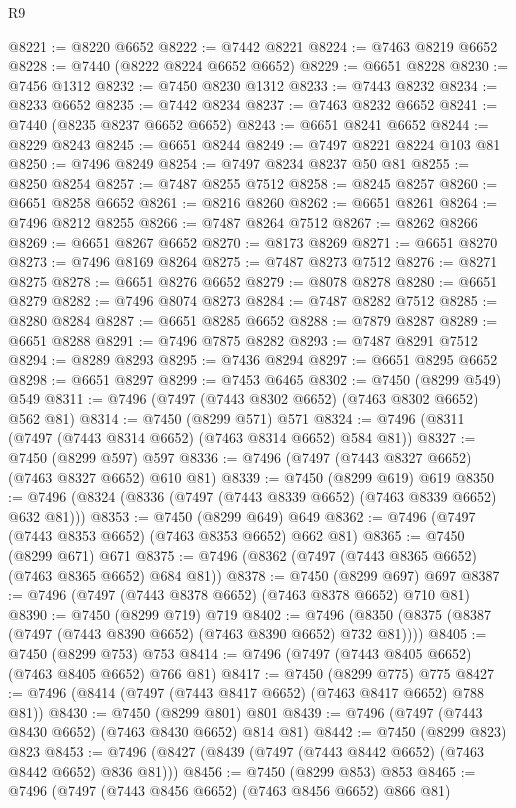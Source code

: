 \begin{lexlean}{R9}
\begin{coremodule}
@8221 := @8220 @6652
@8222 := @7442 @8221
@8224 := @7463 @8219 @6652
@8228 := @7440 (@8222 @8224 @6652 @6652)
@8229 := @6651 @8228
@8230 := @7456 @1312
@8232 := @7450 @8230 @1312
@8233 := @7443 @8232
@8234 := @8233 @6652
@8235 := @7442 @8234
@8237 := @7463 @8232 @6652
@8241 := @7440 (@8235 @8237 @6652 @6652)
@8243 := @6651 @8241 @6652
@8244 := @8229 @8243
@8245 := @6651 @8244
@8249 := @7497 @8221 @8224 @103 @81
@8250 := @7496 @8249
@8254 := @7497 @8234 @8237 @50 @81
@8255 := @8250 @8254
@8257 := @7487 @8255 @7512
@8258 := @8245 @8257
@8260 := @6651 @8258 @6652
@8261 := @8216 @8260
@8262 := @6651 @8261
@8264 := @7496 @8212 @8255
@8266 := @7487 @8264 @7512
@8267 := @8262 @8266
@8269 := @6651 @8267 @6652
@8270 := @8173 @8269
@8271 := @6651 @8270
@8273 := @7496 @8169 @8264
@8275 := @7487 @8273 @7512
@8276 := @8271 @8275
@8278 := @6651 @8276 @6652
@8279 := @8078 @8278
@8280 := @6651 @8279
@8282 := @7496 @8074 @8273
@8284 := @7487 @8282 @7512
@8285 := @8280 @8284
@8287 := @6651 @8285 @6652
@8288 := @7879 @8287
@8289 := @6651 @8288
@8291 := @7496 @7875 @8282
@8293 := @7487 @8291 @7512
@8294 := @8289 @8293
@8295 := @7436 @8294
@8297 := @6651 @8295 @6652
@8298 := @6651 @8297
@8299 := @7453 @6465
@8302 := @7450 (@8299 @549) @549
@8311 := @7496 (@7497 (@7443 @8302 @6652) (@7463 @8302 @6652) @562 @81)
@8314 := @7450 (@8299 @571) @571
@8324 := @7496 (@8311 (@7497 (@7443 @8314 @6652) (@7463 @8314 @6652) @584 @81))
@8327 := @7450 (@8299 @597) @597
@8336 := @7496 (@7497 (@7443 @8327 @6652) (@7463 @8327 @6652) @610 @81)
@8339 := @7450 (@8299 @619) @619
@8350 := @7496 (@8324 (@8336 (@7497 (@7443 @8339 @6652) (@7463 @8339 @6652) @632 @81)))
@8353 := @7450 (@8299 @649) @649
@8362 := @7496 (@7497 (@7443 @8353 @6652) (@7463 @8353 @6652) @662 @81)
@8365 := @7450 (@8299 @671) @671
@8375 := @7496 (@8362 (@7497 (@7443 @8365 @6652) (@7463 @8365 @6652) @684 @81))
@8378 := @7450 (@8299 @697) @697
@8387 := @7496 (@7497 (@7443 @8378 @6652) (@7463 @8378 @6652) @710 @81)
@8390 := @7450 (@8299 @719) @719
@8402 := @7496 (@8350 (@8375 (@8387 (@7497 (@7443 @8390 @6652) (@7463 @8390 @6652) @732 @81))))
@8405 := @7450 (@8299 @753) @753
@8414 := @7496 (@7497 (@7443 @8405 @6652) (@7463 @8405 @6652) @766 @81)
@8417 := @7450 (@8299 @775) @775
@8427 := @7496 (@8414 (@7497 (@7443 @8417 @6652) (@7463 @8417 @6652) @788 @81))
@8430 := @7450 (@8299 @801) @801
@8439 := @7496 (@7497 (@7443 @8430 @6652) (@7463 @8430 @6652) @814 @81)
@8442 := @7450 (@8299 @823) @823
@8453 := @7496 (@8427 (@8439 (@7497 (@7443 @8442 @6652) (@7463 @8442 @6652) @836 @81)))
@8456 := @7450 (@8299 @853) @853
@8465 := @7496 (@7497 (@7443 @8456 @6652) (@7463 @8456 @6652) @866 @81)

\end{coremodule}
\end{lexlean}

